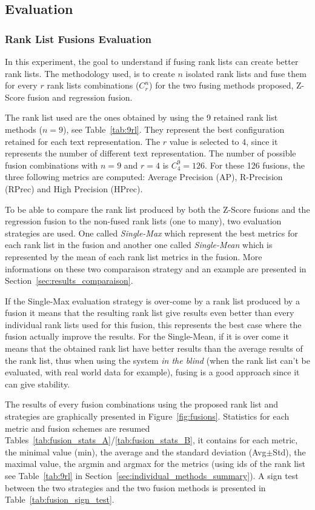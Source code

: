 \subsection{Evaluation}

\subsubsection{Rank List Fusions Evaluation \label{sec:eval_fusion}}

In this experiment, the goal to understand if fusing rank lists can create better rank lists.
The methodology used, is to create $n$ isolated rank lists and fuse them for every $r$ rank lists combinations ($C^n_r$) for the two fusing methods proposed, Z-Score fusion and regression fusion.

The rank list used are the ones obtained by using the 9 retained rank list methods ($n=9$), see Table~\ref{tab:9rl}.
They represent the best configuration retained for each text representation.
The $r$ value is selected to $4$, since it represents the number of different text representation.
The number of possible fusion combinations with $n=9$ and $r=4$ is $C^{9}_{4} = 126$.
For these 126 fusions, the three following metrics are computed: Average Precision (AP), R-Precision (RPrec) and High Precision (HPrec).

To be able to compare the rank list produced by both the Z-Score fusions and the regression fusion to the non-fused rank lists (one to many), two evaluation strategies are used.
One called \textit{Single-Max} which represent the best metrics for each rank list in the fusion and another one called \textit{Single-Mean} which is represented by the mean of each rank list metrics in the fusion.
More informations on these two comparaison strategy and an example are presented in Section~\ref{sec:results_comparaison}.

If the Single-Max evaluation strategy is over-come by a rank list produced by a fusion it means that the resulting rank list give results even better than every individual rank lists used for this fusion, this represents the best case where the fusion actually improve the results.
For the Single-Mean, if it is over come it means that the obtained rank list have better results than the average results of the rank list, thus when using the system \textit{in the blind} (when the rank list can't be evaluated, with real world data for example), fusing is a good approach since it can give stability.

The results of every fusion combinations using the proposed rank list and strategies are graphically presented in Figure~\ref{fig:fusions}.
Statistics for each metric and fusion schemes are resumed Tables~\ref{tab:fusion_stats_A}/\ref{tab:fusion_stats_B}, it contains for each metric, the minimal value (min), the average and the standard deviation (Avg$\pm$Std), the maximal value, the argmin and argmax for the metrics (using ids of the rank list see Table~\ref{tab:9rl} in Section~\ref{sec:individual_methods_summary}).
A sign test between the two strategies and the two fusion methods is presented in Table~\ref{tab:fusion_sign_test}.

